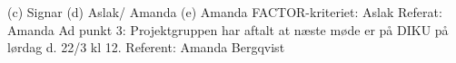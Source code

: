 \documentclass[a4paper,12pt]{article}
\begin{document}
\newline
(c) Signar 
\newline
\newline
(d) Aslak/ Amanda
\newline
\newline
(e) Amanda
\newline
\newline
FACTOR-kriteriet: Aslak
\newline
\newline
Referat: Amanda
\newline
\newline
Ad punkt 3: Projektgruppen har aftalt at næste møde er på DIKU på lørdag d. 22/3 kl 12. 
\newline
\newline
\newline
\newline
Referent: Amanda Bergqvist
\end{document}
